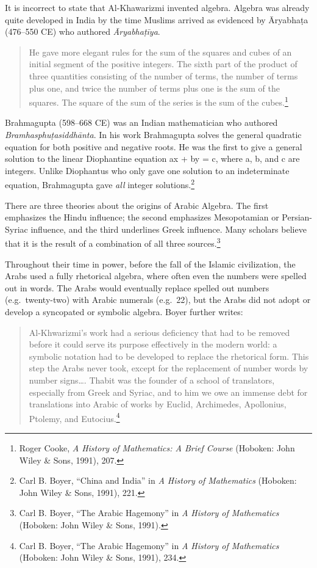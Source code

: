 It is incorrect to state that Al-Khawarizmi invented algebra. Algebra was already quite developed in India by the time Muslims arrived as evidenced by Āryabhaṭa (476–550 CE) who authored \textit{Āryabhaṭīya}. 
\begin{quote}
He gave more elegant rules for the sum of the squares and cubes of an initial segment of the positive integers. The sixth part of the product of three quantities consisting of the number of terms, the number of terms plus one, and twice the number of terms plus one is the sum of the squares. The square of the sum of the series is the sum of the cubes.\footnote{Roger Cooke, \textit{A History of Mathematics: A Brief Course} (Hoboken: John Wiley \& Sons, 1991), 207.}
\end{quote}
Brahmagupta (598--668 CE) was an Indian mathematician who authored \textit{Bramhasphuṭasiddhānta}. In his work Brahmagupta solves the general quadratic equation for both positive and negative roots. He was the first to give a general solution to the linear Diophantine equation ax + by = c, where a, b, and c are integers. Unlike Diophantus who only gave one solution to an indeterminate equation, Brahmagupta gave \textit{all} integer solutions.\footnote{Carl B. Boyer, “China 	and India” in \textit{A History of Mathematics}  (Hoboken: John Wiley \& Sons, 1991), 221.}

There are three theories about the origins of Arabic Algebra. The first emphasizes the Hindu influence; the second emphasizes Mesopotamian or Persian-Syriac influence, and the third underlines Greek influence. Many scholars believe that it is the result of a combination of all three sources.\footnote{Carl B. Boyer, “The 	Arabic Hagemony” in \textit{A History of Mathematics} (Hoboken: John Wiley \& Sons, 1991).} 

Throughout their time in power, before the fall of the Islamic civilization, the Arabs used a fully rhetorical algebra, where often even the numbers were spelled out in words. The Arabs would eventually replace spelled out numbers (e.g.\ twenty-two) with Arabic numerals (e.g.\ 22), but the Arabs did not adopt or develop a syncopated or symbolic algebra. Boyer further writes:
\begin{quote}
Al-Khwarizmi's work had a serious deficiency that had to be removed before it could serve its purpose effectively in the modern world: a symbolic notation had to be developed to replace the rhetorical form. This step the Arabs never took, except for the replacement of number words by number signs…. Thabit was the founder of a school of translators, especially from Greek and Syriac, and to him we owe an immense debt for translations into Arabic of works by Euclid, Archimedes, Apollonius, Ptolemy, and Eutocius.\footnote{Carl B. Boyer, “The Arabic Hagemony” in \textit{A History of Mathematics} (Hoboken: John Wiley \& Sons, 1991), 234.}
\end{quote}

